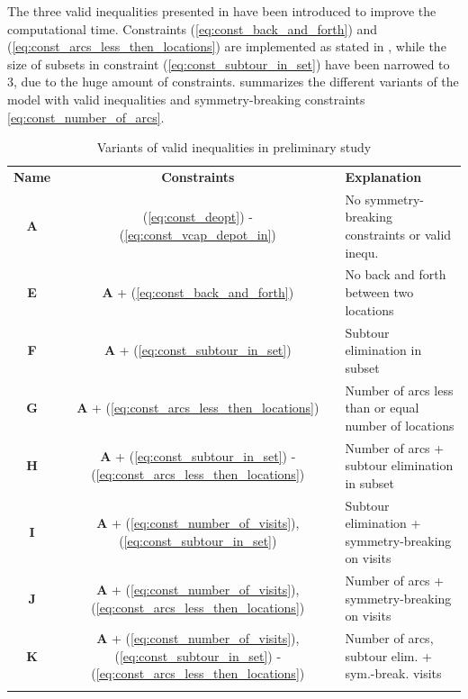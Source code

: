 The three valid inequalities presented in  have been introduced to improve the computational time. Constraints (\ref{eq:const_back_and_forth}) and (\ref{eq:const_arcs_less_then_locations}) are implemented as stated in , while the size of subsets in constraint (\ref{eq:const_subtour_in_set}) have been narrowed to 3, due to the huge amount of constraints.  summarizes the different variants of the model with valid inequalities and symmetry-breaking constraints \eqref{eq:const_number_of_arcs}. 
\\
\begin{table}[H]
    \centering
    \caption{Variants of valid inequalities in preliminary study}
    \begin{tabular}{c c l}
        \thickhline
        \textbf{Name} & \textbf{Constraints} & \textbf{Explanation}\\
        \thickhline
        \textbf{A} & (\ref{eq:const_deopt}) - (\ref{eq:const_vcap_depot_in}) & No symmetry-breaking constraints or valid inequ.\\
        \textbf{E} & \textbf{A} + (\ref{eq:const_back_and_forth}) & No back and forth between two locations \\
        \textbf{F} & \textbf{A} + (\ref{eq:const_subtour_in_set}) & Subtour elimination in subset\\
        \textbf{G} & \textbf{A} + (\ref{eq:const_arcs_less_then_locations}) & Number of arcs less than or equal number of locations\\
        \textbf{H} & \textbf{A} + (\ref{eq:const_subtour_in_set}) - (\ref{eq:const_arcs_less_then_locations}) & Number of arcs + subtour elimination in subset\\
        \textbf{I} & \textbf{A} + (\ref{eq:const_number_of_visits}), (\ref{eq:const_subtour_in_set}) & Subtour elimination + symmetry-breaking on visits\\
        \textbf{J} & \textbf{A} + (\ref{eq:const_number_of_visits}), (\ref{eq:const_arcs_less_then_locations}) & Number of arcs + symmetry-breaking on visits\\
        \textbf{K} & \textbf{A} + (\ref{eq:const_number_of_visits}), (\ref{eq:const_subtour_in_set}) -  (\ref{eq:const_arcs_less_then_locations}) & Number of arcs, subtour elim. + sym.-break. visits\\
        \thickhline
        \end{tabular}
    \label{variants_valid_inequalities_preliminary}
\end{table}

